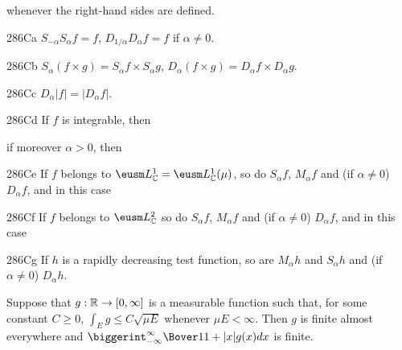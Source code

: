 
\noindent whenever the right-hand sides are defined.   

\spheader 286Ca $S_{-\alpha}S_{\alpha}f=f$, $D_{1/\alpha}D_{\alpha}f=f$
if $\alpha\ne 0$.

\spheader 286Cb
$S_{\alpha}(f\times g)=S_{\alpha}f\times S_{\alpha}g$,
$D_{\alpha}(f\times g)=D_{\alpha}f\times D_{\alpha}g$.

\spheader 286Cc $D_{\alpha}|f|=|D_{\alpha}f|$.

\spheader 286Cd If $f$ is integrable, then


\noindent if moreover $\alpha>0$, then



\spheader 286Ce If $f$ belongs to
$\eusm L^1_{\Bbb C}=\eusm L^1_{\Bbb C}(\mu)$, so do $S_{\alpha}f$,
$M_{\alpha}f$ and (if $\alpha\ne 0$) $D_{\alpha}f$, and in this case


\spheader 286Cf If $f$ belongs to
$\eusm L^2_{\Bbb C}$ so do $S_{\alpha}f$, $M_{\alpha}f$ and (if
$\alpha\ne 0$) $D_{\alpha}f$, and in this case


\spheader 286Cg If $h$ is a rapidly decreasing test
function, so are
$M_{\alpha}h$ and $S_{\alpha}h$ and (if $\alpha\ne 0$) $D_{\alpha}h$.

 Suppose that $g:\Bbb R\to[0,\infty]$ is a
measurable function such that, for some constant $C\ge 0$,
$\int_Eg\le C\sqrt{\mu E}$ whenever $\mu E<\infty$.   Then $g$ is finite
almost everywhere and
$\biggerint_{-\infty}^{\infty}\Bover1{1+|x|}g(x)dx$ is finite.

